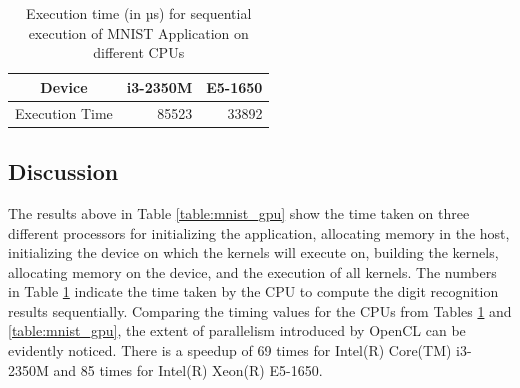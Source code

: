 \begin{table}[h!]
\centering
 \caption{Execution time (in µs) for sequential execution of MNIST Application on different CPUs}
 \vspace{3mm}
 \renewcommand\arraystretch{1.5}
 \begin{tabular}{ | l | r | r | }
 \hline
 \multicolumn{1}{|c|}{\bfseries Device} & \multicolumn{1}{c|}{\bfseries i3-2350M} & \multicolumn{1}{c|}{\bfseries E5-1650} \\
 \hline
 Execution Time & 85523 & 33892 \\
 \hline
 \end{tabular}
 \label{table:mnist_cpu}
\end{table}

\subsection{Discussion}
\label{sect5_3_2}
The results above in Table \ref{table:mnist_gpu} show the time taken on three different processors for initializing the application, allocating memory in the host, initializing the device on which the kernels will execute on, building the kernels, allocating memory on the device, and the execution of all kernels. The numbers in Table \ref{table:mnist_cpu} indicate the time taken by the CPU to compute the digit recognition results sequentially.  \newline\newline
Comparing the timing values for the CPUs from Tables \ref{table:mnist_cpu} and \ref{table:mnist_gpu}, the extent of parallelism introduced by OpenCL can be evidently noticed. There is a speedup of 69 times for Intel(R) Core(TM) i3-2350M and 85 times for Intel(R) Xeon(R) E5-1650. 
\newline\newline
